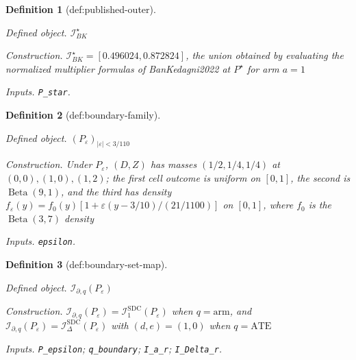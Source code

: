 \documentclass{article}
\newtheorem{definition}{Definition}
\begin{document}
\begin{definition}[def:published-outer]\label{def:published-outer}
\par\smallskip\noindent\emph{Defined object.} \(\mathcal I_{BK}^\star\)
\par\smallskip\noindent\emph{Construction.} \(\mathcal I_{BK}^\star=[0.496024,0.872824]\), the union obtained by evaluating the normalized multiplier formulas of BanKedagni2022 at \(P^\star\) for arm \(a=1\)
\par\smallskip\noindent\emph{Inputs.} \texttt{P\_\allowbreak{}star}.
\end{definition}

\begin{definition}[def:boundary-family]\label{def:boundary-family}
\par\smallskip\noindent\emph{Defined object.} \((P_\varepsilon)_{|\varepsilon|<3/110}\)
\par\smallskip\noindent\emph{Construction.} Under \(P_\varepsilon\), \((D,Z)\) has masses \((1/2,1/4,1/4)\) at \((0,0),(1,0),(1,2)\); the first cell outcome is uniform on \([0,1]\), the second is \(\operatorname{Beta}(9,1)\), and the third has density \(f_\varepsilon(y)=f_0(y)[1+\varepsilon(y-3/10)/(21/1100)]\) on \([0,1]\), where \(f_0\) is the \(\operatorname{Beta}(3,7)\) density
\par\smallskip\noindent\emph{Inputs.} \texttt{epsilon}.
\end{definition}

\begin{definition}[def:boundary-set-map]\label{def:boundary-set-map}
\par\smallskip\noindent\emph{Defined object.} \(\mathcal I_{\partial,q}(P_\varepsilon)\)
\par\smallskip\noindent\emph{Construction.} \(\mathcal I_{\partial,q}(P_\varepsilon)=\mathcal I_1^{\mathrm{SDC}}(P_\varepsilon)\) when \(q=\mathrm{arm}\), and \(\mathcal I_{\partial,q}(P_\varepsilon)=\mathcal I_{\Delta}^{\mathrm{SDC}}(P_\varepsilon)\) with \((d,e)=(1,0)\) when \(q=\mathrm{ATE}\)
\par\smallskip\noindent\emph{Inputs.} \texttt{P\_\allowbreak{}epsilon}; \texttt{q\_\allowbreak{}boundary}; \texttt{I\_\allowbreak{}a\_\allowbreak{}r}; \texttt{I\_\allowbreak{}Delta\_\allowbreak{}r}.
\end{definition}
\end{document}
